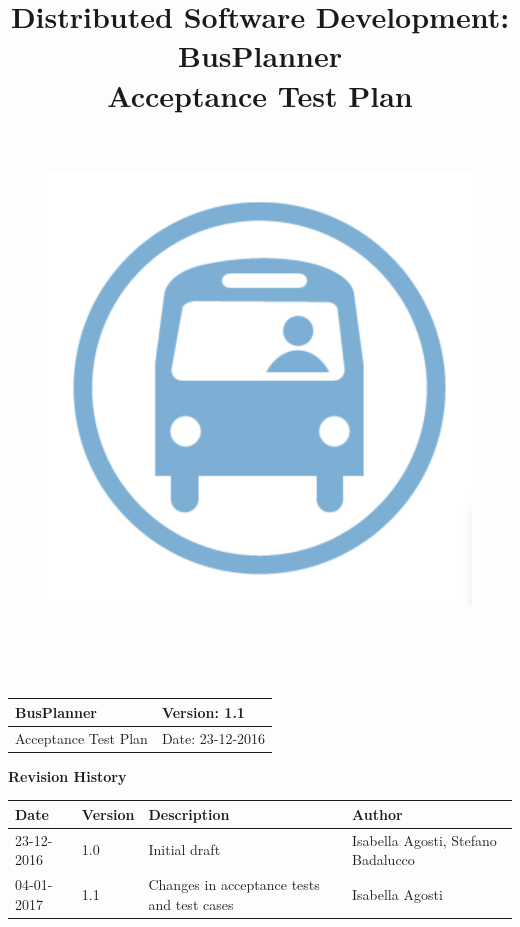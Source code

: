 \documentclass[a4paper, 12pt]{article}
\title{
	\textbf{D}istributed \textbf{S}oftware \textbf{D}evelopment: \textbf{BusPlanner}\\
	\textbf{Acceptance Test Plan}\\
	\begin{figure}[H]
		\centering
		\includegraphics[width=13cm, height=13cm]{Bus_logo}
	\end{figure}
	\date{}
}
\begin{document}
	\begin{table}[t]
		\centering
		\begin{tabular}{| m{6cm} | m{6cm} |}
			\hline
			BusPlanner & Version: 1.1\\
			\hline
			Acceptance Test Plan & Date: 23-12-2016\\
			\hline
		\end{tabular}
	\end{table}
	\maketitle 
	\begin{center}
		\textbf{\Large Revision History}
	\end{center}
	\begin{table}[h]
		\centering
		\begin{tabular}{| m{2cm} | m{2cm} | m{3cm} | m{5cm} |}
			\hline
			\textbf{Date} & \textbf{Version} & \textbf{Description} & \textbf{Author}\\
			\hline
			23-12-2016 & 1.0 & Initial draft & Isabella Agosti, Stefano Badalucco\\
			\hline
			04-01-2017 & 1.1 & Changes in acceptance tests and test cases & Isabella Agosti\\
			\hline
		\end{tabular}
	\end{table}
\newpage
	\tableofcontents
	
	
	
\end{document}
